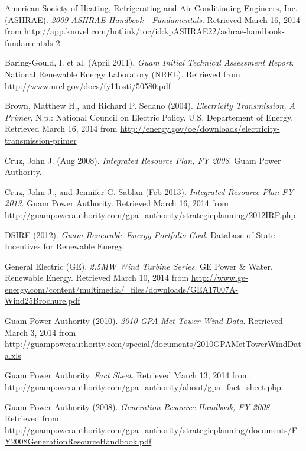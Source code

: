\documentclass[12pt,letterpaper,fleqn]{article}
\begin{document}
\begin{thebibliography}{99}

  American Society of Heating, Refrigerating and Air-Conditioning Engineers, Inc. (ASHRAE). 
  \emph{2009 ASHRAE Handbook - Fundamentals}. 
  Retrieved March 16, 2014 from
  \url{http://app.knovel.com/hotlink/toc/id:kpASHRAE22/ashrae-handbook-fundamentals-2}

  Baring-Gould, I. et al. (April 2011).
  \emph{Guam Initial Technical Assessment Report}.
  National Renewable Energy Laboratory (NREL).
  Retrieved from \url{http://www.nrel.gov/docs/fy11osti/50580.pdf}
  
  Brown, Matthew H., and Richard P. Sedano (2004).
  \emph{Electricity Transmission, A Primer}.
  N.p.: National Council on Electric Policy.
  U.S. Departement of Energy.
  Retrieved March 16, 2014 from
  \url{http://energy.gov/oe/downloads/electricity-transmission-primer}

  Cruz, John J. (Aug 2008).
  \emph{Integrated Resource Plan, FY 2008}.
  Guam Power Authority.

  Cruz, John J., and Jennifer G. Sablan (Feb 2013).
  \emph{Integrated Resource Plan FY 2013}.
  Guam Power Authority.
  Retrieved March 16, 2014 from
  \url{http://guampowerauthority.com/gpa_authority/strategicplanning/2012IRP.php}

  DSIRE (2012).
  \emph{Guam Renewable Energy Portfolio Goal}.
  Database of State Incentives for Renewable Energy.
  
  General Electric (GE).
  \emph{2.5MW Wind Turbine Series}.
  GE Power \& Water, Renewable Energy.
  Retrieved March 10, 2014 from
  \url{http://www.ge-energy.com/content/multimedia/_files/downloads/GEA17007A-Wind25Brochure.pdf}

  Guam Power Authority (2010).
  \emph{2010 GPA Met Tower Wind Data}.
  Retrieved March 3, 2014 from
  \url{http://guampowerauthority.com/special/documents/2010GPAMetTowerWindData.xls}

  Guam Power Authority.
  \emph{Fact Sheet}.
  Retrieved March 13, 2014 from: 
  \url{http://guampowerauthority.com/gpa_authority/about/gpa_fact_sheet.php}.

  Guam Power Authority (2008).
  \emph{Generation Resource Handbook, FY 2008}.
  Retrieved from
  \url{http://guampowerauthority.com/gpa_authority/strategicplanning/documents/FY2008GenerationResourceHandbook.pdf}


\end{thebibliography}
\end{document}
